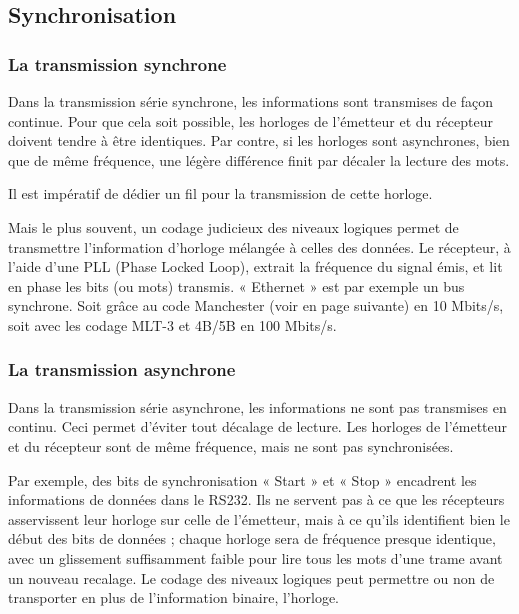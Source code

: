 \documentclass[10pt]{article}
\begin{document}
\subsection{Synchronisation}

\subsubsection*{La transmission synchrone}
Dans la transmission série synchrone, les informations sont transmises de façon continue. Pour que cela soit possible, les horloges de l’émetteur et du récepteur doivent tendre à être identiques. Par contre, si les horloges sont asynchrones, bien que de même fréquence, une légère différence finit par décaler la lecture des mots. 

Il est impératif de dédier un fil pour la transmission de cette horloge.

Mais le plus souvent, un codage judicieux des niveaux logiques permet de transmettre l’information d’horloge mélangée à celles des données. Le récepteur, à l’aide d’une PLL (Phase Locked Loop), extrait la fréquence du signal émis, et lit en phase les bits (ou mots) transmis.
« Ethernet » est par exemple un bus synchrone. Soit grâce au code Manchester (voir en page suivante) en 10 Mbits/s, soit avec les codage MLT-3 et 4B/5B en 100 Mbits/s.

\subsubsection*{La transmission asynchrone}

Dans la transmission série asynchrone, les informations ne sont pas transmises en continu. Ceci permet d’éviter tout décalage de lecture. Les horloges de l’émetteur et du récepteur sont de même fréquence, mais ne sont pas synchronisées.

Par exemple, des bits de synchronisation « Start » et « Stop » encadrent les informations de données dans le RS232. Ils ne servent pas à ce que les récepteurs asservissent leur horloge sur celle de l’émetteur, mais à ce qu’ils identifient bien le début des bits de données ; chaque horloge sera de fréquence presque identique, avec un glissement suffisamment faible pour lire tous les mots d’une trame avant un nouveau recalage.
Le codage des niveaux logiques peut permettre ou non de transporter en plus de l’information binaire, l’horloge.
\end{document}
